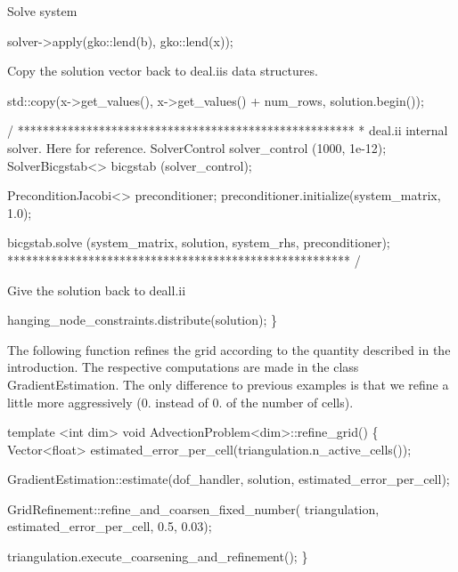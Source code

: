 Solve system


\begin{DoxyCode}
solver->apply(gko::lend(b), gko::lend(x));
\end{DoxyCode}


Copy the solution vector back to deal.\+ii\textquotesingle{}s data structures.


\begin{DoxyCode}
std::copy(x->get\_values(), x->get\_values() + num\_rows, solution.begin());

/ ******************************************************
 * deal.ii \textcolor{keyword}{internal} solver. Here \textcolor{keywordflow}{for} reference.
 SolverControl           solver\_control (1000, 1e-12);
 SolverBicgstab<>        bicgstab (solver\_control);

 PreconditionJacobi<> preconditioner;
 preconditioner.initialize(system\_matrix, 1.0);

 bicgstab.solve (system\_matrix, solution, system\_rhs,
                 preconditioner);
******************************************************* /
\end{DoxyCode}


Give the solution back to deall.\+ii


\begin{DoxyCode}
    hanging\_node\_constraints.distribute(solution);
\}
\end{DoxyCode}


The following function refines the grid according to the quantity described in the introduction. The respective computations are made in the class {\ttfamily Gradient\+Estimation}. The only difference to previous examples is that we refine a little more aggressively (0. instead of 0. of the number of cells).


\begin{DoxyCode}
\textcolor{keyword}{template} <\textcolor{keywordtype}{int} dim>
\textcolor{keywordtype}{void} AdvectionProblem<dim>::refine\_grid()
\{
    Vector<float> estimated\_error\_per\_cell(triangulation.n\_active\_cells());

    GradientEstimation::estimate(dof\_handler, solution,
                                 estimated\_error\_per\_cell);

    GridRefinement::refine\_and\_coarsen\_fixed\_number(
        triangulation, estimated\_error\_per\_cell, 0.5, 0.03);

    triangulation.execute\_coarsening\_and\_refinement();
\}
\end{DoxyCode}


